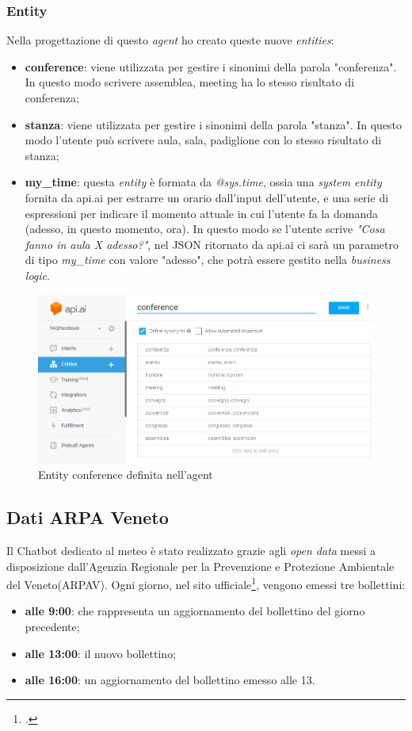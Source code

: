 \subsubsection{Entity}
Nella progettazione di questo \emph{agent} ho creato queste nuove \emph{entities}:
\begin{itemize}
	\item \textbf{conference}: viene utilizzata per gestire i sinonimi della parola "conferenza". In questo modo scrivere assemblea, meeting ha lo stesso risultato di conferenza;
	\item \textbf{stanza}: viene utilizzata per gestire i sinonimi della parola "stanza". In questo modo l'utente può scrivere aula, sala, padiglione con lo stesso risultato di stanza;
	\item \textbf{my\_time}: questa \emph{entity} è formata da \emph{@sys.time}, ossia una \emph{system entity} fornita da api.ai per estrarre un orario dall'input dell'utente, e una serie di espressioni per indicare il momento attuale in cui l'utente fa la domanda (adesso, in questo momento, ora). In questo modo se l'utente scrive \emph{"Cosa fanno in aula X adesso?"}, nel \gls{JSON} ritornato da api.ai ci sarà un parametro di tipo \emph{my\_time} con valore "adesso", che potrà essere gestito nella \emph{business logic}.
\end{itemize}

\begin{figure}[h!]
	\centering
	\includegraphics[scale=0.5]{../Immagini/conference.png}
	\caption{Entity conference definita nell'agent}
\end{figure}

\subsection{Dati ARPA Veneto}
Il \gls{Chatbot} dedicato al meteo è stato realizzato grazie agli \emph{open data} messi a disposizione dall'Agenzia Regionale per la Prevenzione e Protezione Ambientale del Veneto(ARPAV). Ogni giorno, nel sito ufficiale\footcite{arpav}, vengono emessi tre bollettini:
\begin{itemize}
	\item \textbf{alle 9:00}: che rappresenta un aggiornamento del bollettino del giorno precedente;
	\item \textbf{alle 13:00}: il nuovo bollettino;
	\item \textbf{alle 16:00}: un aggiornamento del bollettino emesso alle 13.
\end{itemize} 

